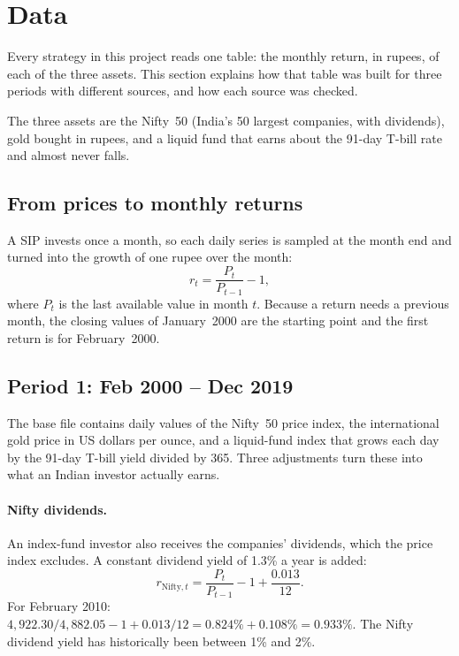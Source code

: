 \section{Data}
\label{ch:data}

Every strategy in this project reads one table: the monthly return, in rupees, of each of the three
assets. This section explains how that table was built for three periods with different sources,
and how each source was checked.

The three assets are the Nifty~50 (India's 50 largest companies, with dividends), gold bought in rupees, and a liquid fund that earns about the 91-day T-bill rate and almost never falls.

\subsection{From prices to monthly returns}

A SIP invests once a month, so each daily series is sampled at the month end and turned into the
growth of one rupee over the month:
\begin{equation}
  r_t = \frac{P_t}{P_{t-1}} - 1 ,
  \label{eq:return}
\end{equation}
where $P_t$ is the last available value in month $t$. Because a return needs a previous month, the
closing values of January~2000 are the starting point and the first return is for February~2000.

\subsection{Period 1: Feb 2000 -- Dec 2019}

The base file contains daily values of the Nifty~50 price index, the international gold price in US
dollars per ounce, and a liquid-fund index that grows each day by the 91-day T-bill yield divided by
365. Three adjustments turn these into what an Indian investor actually earns.

\paragraph{Nifty dividends.} An index-fund investor also receives the companies' dividends, which
the price index excludes. A constant dividend yield of 1.3\% a year is added:
\begin{equation}
  r_{\text{Nifty},t} = \frac{P_t}{P_{t-1}} - 1 + \frac{0.013}{12}.
\end{equation}
For February 2010: $4{,}922.30 / 4{,}882.05 - 1 + 0.013/12 = 0.824\% + 0.108\% = 0.933\%$.
The Nifty dividend yield has historically been between 1\% and 2\%.

